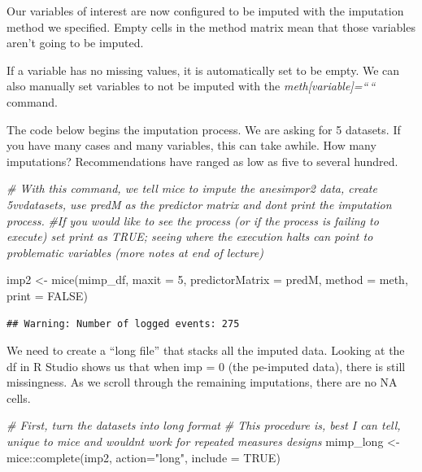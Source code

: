\documentclass[
]{book}
\newenvironment{Shaded}{\begin{snugshade}}{\end{snugshade}}
\newcommand{\AttributeTok}[1]{\textcolor[rgb]{0.77,0.63,0.00}{#1}}
\newcommand{\CommentTok}[1]{\textcolor[rgb]{0.56,0.35,0.01}{\textit{#1}}}
\newcommand{\ConstantTok}[1]{\textcolor[rgb]{0.00,0.00,0.00}{#1}}
\newcommand{\DecValTok}[1]{\textcolor[rgb]{0.00,0.00,0.81}{#1}}
\newcommand{\FunctionTok}[1]{\textcolor[rgb]{0.00,0.00,0.00}{#1}}
\newcommand{\NormalTok}[1]{#1}
\newcommand{\OtherTok}[1]{\textcolor[rgb]{0.56,0.35,0.01}{#1}}
\newcommand{\SpecialCharTok}[1]{\textcolor[rgb]{0.00,0.00,0.00}{#1}}
\newcommand{\StringTok}[1]{\textcolor[rgb]{0.31,0.60,0.02}{#1}}
\begin{document}
Our variables of interest are now configured to be imputed with the imputation method we specified. Empty cells in the method matrix mean that those variables aren't going to be imputed.

If a variable has no missing values, it is automatically set to be empty. We can also manually set variables to not be imputed with the \emph{meth{[}variable{]}=``\,``} command.

The code below begins the imputation process. We are asking for 5 datasets. If you have many cases and many variables, this can take awhile. How many imputations? Recommendations have ranged as low as five to several hundred.

\begin{Shaded}
\begin{Highlighting}[]
\CommentTok{\# With this command, we tell mice to impute the anesimpor2 data, create 5vvdatasets, use predM as the predictor matrix and don\textquotesingle{}t print the imputation process. }
\CommentTok{\#If you would like to see the process (or if the process is failing to execute) set print as TRUE; seeing where the execution halts can point to problematic variables (more notes at end of lecture)}

\NormalTok{imp2 }\OtherTok{\textless{}{-}} \FunctionTok{mice}\NormalTok{(mimp\_df, }\AttributeTok{maxit =} \DecValTok{5}\NormalTok{, }
             \AttributeTok{predictorMatrix =}\NormalTok{ predM, }
             \AttributeTok{method =}\NormalTok{ meth, }\AttributeTok{print =}  \ConstantTok{FALSE}\NormalTok{)}
\end{Highlighting}
\end{Shaded}

\begin{verbatim}
## Warning: Number of logged events: 275
\end{verbatim}

We need to create a ``long file'' that stacks all the imputed data. Looking at the df in R Studio shows us that when imp = 0 (the pe-imputed data), there is still missingness. As we scroll through the remaining imputations, there are no NA cells.

\begin{Shaded}
\begin{Highlighting}[]
\CommentTok{\# First, turn the datasets into long format}
\CommentTok{\# This procedure is, best I can tell, unique to mice and wouldn\textquotesingle{}t work for repeated measures designs}
\NormalTok{mimp\_long }\OtherTok{\textless{}{-}}\NormalTok{ mice}\SpecialCharTok{::}\FunctionTok{complete}\NormalTok{(imp2, }\AttributeTok{action=}\StringTok{"long"}\NormalTok{, }\AttributeTok{include =} \ConstantTok{TRUE}\NormalTok{)}
\end{Highlighting}
\end{Shaded}
\end{document}
